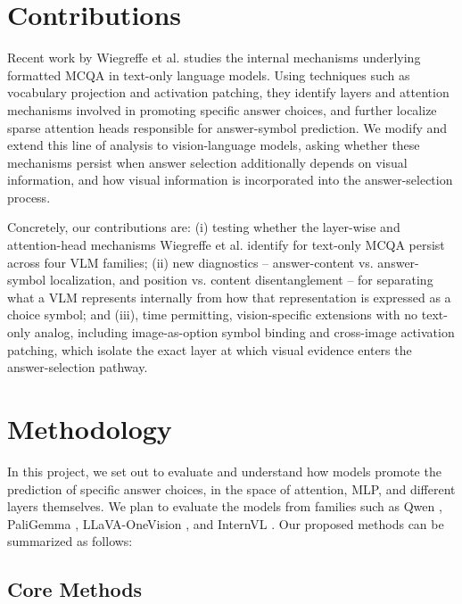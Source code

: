 \documentclass[11pt]{article}
\begin{document}
\section{Contributions}

Recent work by Wiegreffe et al. \cite{wiegreffe2025answerassembleaceunderstanding} studies the internal mechanisms underlying formatted MCQA in text-only language models. Using techniques such as vocabulary projection and activation patching, they identify layers and attention mechanisms involved in promoting specific answer choices, and further localize sparse attention heads responsible for answer-symbol prediction. We modify and extend this line of analysis to vision-language models, asking whether these mechanisms persist when answer selection additionally depends on visual information, and how visual information is incorporated into the answer-selection process.

Concretely, our contributions are: (i) testing whether the layer-wise and attention-head mechanisms Wiegreffe et al. identify for text-only MCQA persist across four VLM families; (ii) new diagnostics -- answer-content vs. answer-symbol localization, and position vs. content disentanglement -- for separating what a VLM represents internally from how that representation is expressed as a choice symbol; and (iii), time permitting, vision-specific extensions with no text-only analog, including image-as-option symbol binding and cross-image activation patching, which isolate the exact layer at which visual evidence enters the answer-selection pathway.

\section{Methodology}

In this project, we set out to evaluate and understand how models promote the prediction of specific answer choices, in the space of attention, MLP, and different layers themselves. We plan to evaluate the models from families such as Qwen \cite{bai2025qwen3vltechnicalreport}, PaliGemma \cite{beyer2024paligemmaversatile3bvlm}, LLaVA-OneVision \cite{li2024llavaonevisioneasyvisualtask}, and InternVL \cite{wang2025internvl35advancingopensourcemultimodal}. Our proposed methods can be summarized as follows:

\subsection{Core Methods}
\end{document}
